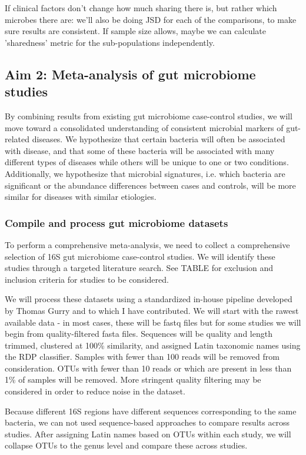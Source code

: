 \documentclass[12pt]{article}
\begin{document}
If clinical factors don't change how much sharing there is, but rather which microbes there are: we'll also be doing JSD for each of the comparisons, to make sure results are consistent. If sample size allows, maybe we can calculate 'sharedness' metric for the sub-populations independently.

\subsection{Aim 2: Meta-analysis of gut microbiome studies}
By combining results from existing gut microbiome case-control studies, we will move toward a consolidated understanding of consistent microbial markers of gut-related diseases. We hypothesize that certain bacteria will often be associated with disease, and that some of these bacteria will be associated with many different types of diseases while others will be unique to one or two conditions. Additionally, we hypothesize that microbial signatures, i.e. which bacteria are significant or the abundance differences between cases and controls, will be more similar for diseases with similar etiologies.

\subsubsection{Compile and process gut microbiome datasets}
To perform a comprehensive meta-analysis, we need to collect a comprehensive selection of 16S gut microbiome case-control studies. We will identify these studies through a targeted literature search.  See TABLE for exclusion and inclusion criteria for studies to be considered.

We will process these datasets using a standardized in-house pipeline developed by Thomas Gurry and to which I have contributed. We will start with the rawest available data - in most cases, these will be fastq files but for some studies we will begin from quality-filtered fasta files. Sequences will be quality and length trimmed, clustered at 100\% similarity, and assigned Latin taxonomic names using the RDP classifier. Samples with fewer than 100 reads will be removed from consideration. OTUs with fewer than 10 reads or which are present in less than 1\% of samples will be removed. More stringent quality filtering may be considered in order to reduce noise in the dataset.

Because different 16S regions have different sequences corresponding to the same bacteria, we can not used sequence-based approaches to compare results across studies. After assigning Latin names based on OTUs within each study, we will collapse OTUs to the genus level and compare these across studies.
\end{document}
